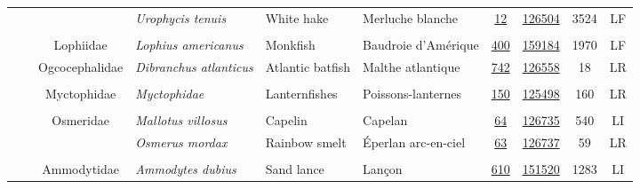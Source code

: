 \documentclass[12pt]{article}\usepackage[]{graphicx}\usepackage[]{color}
\begin{document}
\begin{landscapepage}
\begin{longtable}[t]{ccc>{\centering\arraybackslash}p{3cm}>{\centering\arraybackslash}p{3cm}>{\centering\arraybackslash}p{3cm}>{}c>{}ccc}
\hspace{1em}\hspace{1em} &  &  & \em{Urophycis tenuis} & White hake & Merluche blanche & \href{#sec:306}{12} & \href{http://www.marinespecies.org/aphia.php?p=taxdetails&id=127195}{126504} & 3524 & LF\\
\addlinespace[0.3em]
\\
\hspace{1em}\hspace{1em} &  & Lophiidae & \em{Lophius americanus} & Monkfish & Baudroie d'Amérique & \href{#sec:307}{400} & \href{http://www.marinespecies.org/aphia.php?p=taxdetails&id=127235}{159184} & 1970 & LF\\
\hspace{1em}\hspace{1em} &  & Ogcocephalidae & \em{Dibranchus atlanticus} & Atlantic batfish & Malthe atlantique & \href{#sec:314}{742} & \href{http://www.marinespecies.org/aphia.php?p=taxdetails&id=127200}{126558} & 18 & LR\\
\addlinespace[0.3em]
\\
\hspace{1em}\hspace{1em} &  & Myctophidae & \em{Myctophidae} & Lanternfishes & Poissons-lanternes & \href{#sec:320}{150} & \href{http://www.marinespecies.org/aphia.php?p=taxdetails&id=159518}{125498} & 160 & LR\\
\addlinespace[0.3em]
\\
\hspace{1em}\hspace{1em} &  & Osmeridae & \em{Mallotus villosus} & Capelin & Capelan & \href{#sec:340}{64} & \href{http://www.marinespecies.org/aphia.php?p=taxdetails&id=159459}{126735} & 540 & LI\\
\hspace{1em}\hspace{1em} &  &  & \em{Osmerus mordax} & Rainbow smelt & Éperlan arc-en-ciel & \href{#sec:341}{63} & \href{http://www.marinespecies.org/aphia.php?p=taxdetails&id=274356}{126737} & 59 & LR\\
\addlinespace[0.3em]
\\
\hspace{1em}\hspace{1em} &  & Ammodytidae & \em{Ammodytes dubius} & Sand lance & Lançon & \href{#sec:350}{610} & \href{http://www.marinespecies.org/aphia.php?p=taxdetails&id=127191}{151520} & 1283 & LI\\

\end{longtable}
\end{landscapepage}
\end{document}
